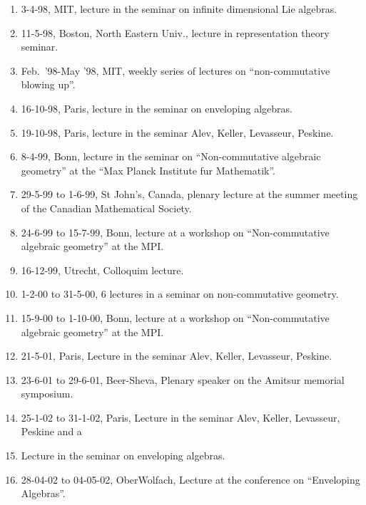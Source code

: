 \documentclass{amsart}
\begin{document}
\begin{enumerate}
\item
3-4-98, MIT, lecture in the seminar on infinite dimensional Lie
algebras.
\item 11-5-98, Boston, North Eastern Univ., lecture in
representation theory seminar.
\item
Feb.\ '98-May '98, MIT, weekly series of lectures on
``non-commutative blowing up''.
\item
16-10-98, Paris, lecture in the seminar on enveloping
algebras.
\item
19-10-98, Paris, lecture in the seminar Alev, Keller, Levasseur,
Peskine.
\item 8-4-99, Bonn, lecture in the seminar on ``Non-commutative
  algebraic geometry'' at the ``Max Planck Institute fur
  Mathematik''. 
\item 29-5-99 to 1-6-99, St John's, Canada, plenary lecture at the
  summer meeting of the Canadian Mathematical Society.
\item 24-6-99 to 15-7-99, Bonn, lecture at a workshop on
  ``Non-commutative algebraic geometry'' at the MPI.
\item 16-12-99, Utrecht, Colloquim lecture. 
\item 1-2-00 to 31-5-00, 6 lectures in a seminar on non-commutative geometry.
\item 15-9-00 to 1-10-00, Bonn, lecture at a workshop on
  ``Non-commutative algebraic geometry'' at the MPI.
\item 21-5-01, Paris, Lecture in the seminar Alev, Keller, Levasseur,
Peskine.
\item  23-6-01 to 29-6-01, Beer-Sheva, Plenary speaker on the Amitsur
memorial symposium.
\item 25-1-02 to 31-1-02, Paris, Lecture in the seminar Alev, Keller, Levasseur,
Peskine and a
\item Lecture in  the seminar on enveloping algebras.
\item 28-04-02 to 04-05-02, OberWolfach, Lecture at the conference on
``Enveloping Algebras''.


\end{enumerate}
\end{document}
